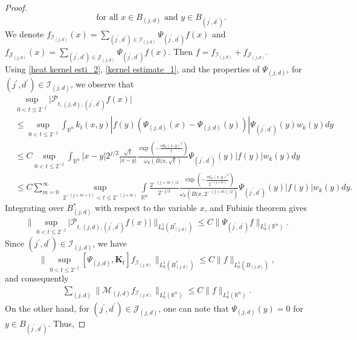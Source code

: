 \documentclass[11pt, reqno]{amsproc}
\theoremstyle{definition}
\theoremstyle{remark}
\numberwithin{equation}{section}
\begin{document}
\begin{proof}
\[\quad \text{for all } x \in B_{(j,d)} \text{ and } y \in B_{(j^{\prime},d^{\prime})}.
\] We denote $f_{\mathcal{I}_{(j,d)}}(x)= \sum_{(j^{\prime},d^{\prime}) \in \mathcal{I}_{(j,d)}} \Psi_{(j^\prime,d^\prime)}f(x)$  and  $   f_{\mathcal{J}_{(j,d)}}(x)= \sum_{(j^{\prime},d^{\prime}) \in \mathcal{J}_{(j,d)}} \Psi_{(j^\prime,d^\prime)}f(x).$  
Then $ f = f_{\mathcal{I}_{(j,d)}}+ f_{\mathcal{J}_{(j,d)}}$. \\
Using \eqref{heat kernel esti_2},  \eqref{kernel estimate_1}, and the properties of $\Psi_{(j,d)}$,  for $(j^\prime,d^\prime) \in  \mathcal{I}_(j,d)$, we observe that
\begin{align*}
   &\sup\limits_{0<t\leq 2^{-j}} \Big| \mathcal{P}_{t,(j,d),(j^\prime, d^\prime)}f(x)\Big| 
   \\ &\leq  \sup\limits_{0<t\leq 2^{-j}}  \int_{\mathbb{R}^n} k_t(x,y)|f(y) \left( \Psi_{(j,d)}(x)-\Psi_{(j,d)}(y) \right)| \Psi_{(j^\prime,d^\prime)}(y)w_k(y)dy\\
   & \leq C \sup\limits_{0<t\leq 2^{-j}} \int_{\mathbb{R}^n}|x-y|2^{j/2} \frac{\sqrt{t}}{|x-y|} \frac{\exp\left(-\frac{cd_\mathcal{O}(x,y)^2}{t} \right)}{\omega_k\left( B(x, \sqrt{t} \right)}\Psi_{(j^\prime,d^\prime)}(y)|f(y)|w_k(y)dy\\
   &\leq C \sum_{m=0}^\infty \sup\limits_{2^{-(j+m+1)}<t\leq 2^{-(j+m)}} \int\limits_{\mathbb{R}^n} \frac{2^{-(j+m)/2}}{{2^{-j/2}}} \frac{\exp\left(-\frac{cd_\mathcal{O}(x,y)^2}{2^{-(j+m)}} \right)}{\omega_k\left( B(x, 2^{-(j+m)/2} \right)}\Psi_{(j^\prime,d^\prime)}(y)|f(y)|w_k(y)dy.
\end{align*} 
Integrating over $B_{(j,d)}^{*}$ with respect to the variable $x$, and Fubinis theorem gives  
\begin{align*}
    \Bigg\| \sup\limits_{0<t\leq 2^{-j}} \Big| \mathcal{P}_{t,(j,d),(j^\prime, d^\prime)}f(x)\Big|    \Bigg\|_{L_k^1\left(B_{(j,d)}^{*}\right)} \leq C \|\Psi_{(j^\prime,d^\prime)}f\|_{L_k^1(\mathbb{R}^n)}.
\end{align*} Since $(j^\prime, d^\prime)\in \mathcal{I}_{(j,d)}$, we have
$$ \Bigg\| \sup_{0<t\leq 2^{-j}}[\Psi_{(j,d)},\mathbf{K}_t]f_{\mathcal{I}_{(j,d)}}\Bigg\|_{L_k^1\left(B_{(j,d)}^{*}\right)} \leq C \|f\|_{L_k^1(B_{(j,d)})},$$ and consequently 
\begin{align*}
\sum_{(j,d)}\|\mathcal{M}_{(j,d)}f_{\mathcal{I}_{(j,d)}}\|_{L_k^1(\mathbb{R}^n)} \leq C\|f\|_{L_k^1(\mathbb{R}^n)}.
\end{align*}
On the other hand, for  $(j^\prime,d^\prime) \in  \mathcal{J}_{(j,d)}$, one can note that $\Psi_{(j,d)}(y)=0$ for $y\in B_{(j^\prime,d^\prime)}$. Thus,

\end{proof}
\end{document}
